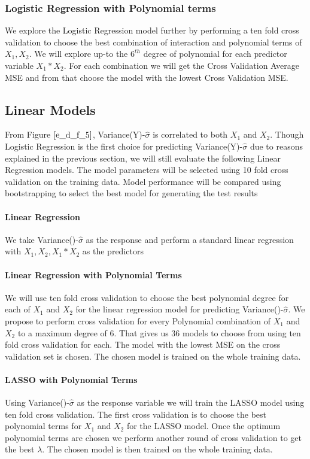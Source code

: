 \documentclass[twoside,12pt]{article}
\begin{document}
\subsubsection{Logistic Regression with Polynomial terms}
We explore the Logistic Regression model further by performing a ten fold cross validation to choose the best combination of interaction and polynomial terms of $X_1,X_2$. We will explore up-to the $6^{th}$ degree of polynomial for each predictor variable $X_1*X_2$. For each combination we will get the Cross Validation Average MSE and from that choose the model with the lowest Cross Validation MSE.

\subsection{Linear Models}
From Figure  $\eqref{e_d_f_5}$, Variance(Y)-$\hat{\sigma}$ is correlated to both $X_1$ and $X_2$. Though Logistic Regression is the first choice for predicting Variance(Y)-$\hat{\sigma}$ due to reasons explained in the previous section, we will still evaluate the following Linear Regression models. The model parameters will be selected using 10 fold cross validation on the training data. Model performance will be compared using bootstrapping to select the best model for generating the test results


\paragraph{Linear Regression}
We take Variance()-$\hat{\sigma}$ as the response and perform a standard linear regression with $X_1,X_2,X_1*X_2$ as the predictors

\paragraph{Linear Regression with Polynomial Terms}
We will use ten fold cross validation to choose the best polynomial degree for each of $X_1$ and $X_2$ for the linear regression model for predicting Variance()-$\hat{\sigma}$. We propose to perform cross validation for every Polynomial combination of $X_1$ and $X_2$ to a maximum degree of 6. That gives us 36 models to choose from using ten fold cross validation for each. The model with the lowest MSE on the cross validation set is chosen. The chosen model is trained on the whole training data.

\paragraph{LASSO with Polynomial Terms}
Using Variance()-$\hat{\sigma}$ as the response variable we will train the LASSO model using ten fold cross validation. The first cross validation is to choose the best polynomial terms for $X_1$ and $X_2$ for the LASSO model. Once the optimum polynomial terms are chosen we perform another round of cross validation to get the best $\lambda$. The chosen model is then trained on the whole training data.
\end{document}
